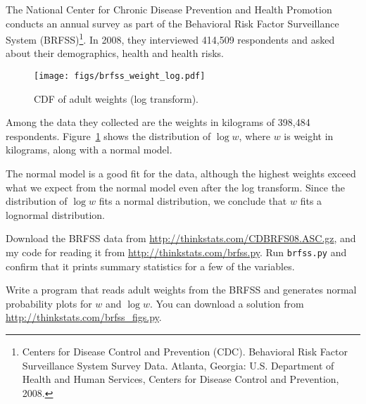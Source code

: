 \documentclass[12pt]{book}
\begin{document}
The National Center for Chronic Disease
Prevention and Health Promotion conducts an annual survey as part of
the Behavioral Risk Factor Surveillance System
(BRFSS)\footnote{Centers for Disease Control and Prevention
  (CDC). Behavioral Risk Factor Surveillance System Survey
  Data. Atlanta, Georgia: U.S. Department of Health and Human
  Services, Centers for Disease Control and Prevention, 2008.}.  In
2008, they interviewed 414,509 respondents and asked about their
demographics, health and health risks.


\begin{figure}
\centerline{
\texttt{[image: figs/brfss\_weight\_log.pdf]}
}
\caption{CDF of adult weights (log
  transform).}
\label{brfss_weight_log}
\end{figure}

Among the data they collected are the weights in kilograms of
398,484 respondents.
Figure~\ref{brfss_weight_log} shows the distribution
of $\log w$, where $w$ is weight in kilograms, along with a normal
model.

The normal model is a good fit for the data, although the highest
weights exceed what we expect from the normal model even after the log
transform.  Since the distribution of $\log w$ fits a normal distribution, we
conclude that $w$ fits a lognormal distribution.



\begin{exercise}
Download the BRFSS data from 
\url{http://thinkstats.com/CDBRFS08.ASC.gz}, and my code for reading it
from
\url{http://thinkstats.com/brfss.py}.  Run {\tt brfss.py} and confirm that
it prints summary statistics for a few of the variables.

Write a program that reads adult weights from the BRFSS and
generates normal probability plots for $w$ and $\log w$.  You can
download a solution from \url{http://thinkstats.com/brfss_figs.py}.

\end{exercise}
\end{document}
